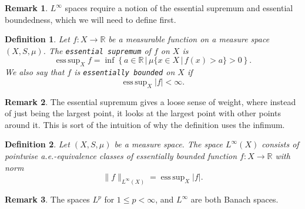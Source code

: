\documentclass[11pt]{article}
\newtheorem{definition}{Definition}
\theoremstyle{definition}
\newtheorem*{remark}{Remark}
\DeclareMathOperator*{\esssup}{ess\,sup}
\begin{document}
\begin{remark}
	$L^{\infty}$ spaces require a notion of the essential supremum and essential boundedness, which we will need to define first.
\end{remark}

\begin{definition}
	Let $f: X \rightarrow \mathbb{R}$ be a measurable function on a measure space $(X,S,\mu)$.
	The \texttt{essential supremum} of $f$ on $X$ is
	\begin{equation*}
		\esssup_X f = \inf{\left\{a \in \mathbb{R} \,|\, \mu\{ x\in X \,|\, f(x) > a\}>0 \right\}}.
	\end{equation*}
	We also say that $f$ is \texttt{essentially bounded} on $X$ if
	\begin{equation*}
		\esssup_X |f| < \infty.
	\end{equation*}
\end{definition}

\begin{remark}
	The essential supremum gives a loose sense of weight, where instead of just being the largest point,
	it looks at the largest point with other points around it. This is sort of the intuition of why the definition uses the infimum.
\end{remark}

\begin{definition}
	Let $(X,S,\mu)$ be a measure space. The space $L^{\infty}(X)$ consists of pointwise a.e.-equivalence classes of essentially
	bounded function $f : X \rightarrow \mathbb{R}$ with norm
	\begin{equation*}
		\|f\|_{L^{\infty}(X)} = \esssup_X |f|.
	\end{equation*}
\end{definition}

\begin{remark}
	The spaces $L^p$ for $1 \leq p < \infty$, and $L^{\infty}$ are both Banach spaces.
\end{remark}


\newpage
\end{document}
